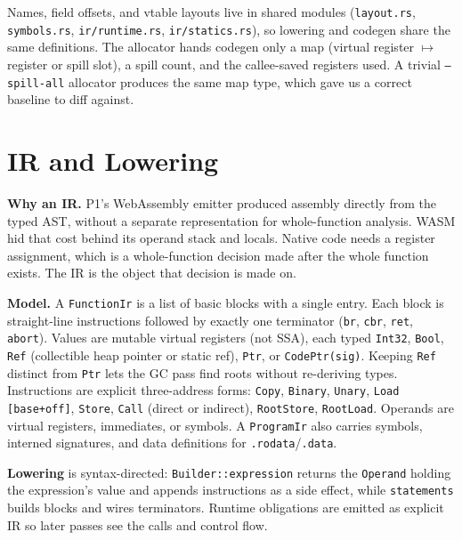 \documentclass[10pt]{article}
\newcommand{\code}[1]{\texttt{\small #1}}
\begin{document}
Names, field offsets, and vtable layouts live in shared modules (\code{layout.rs}, \code{symbols.rs}, \code{ir/runtime.rs}, \code{ir/statics.rs}), so lowering and codegen share the same definitions. The allocator hands codegen only a map (virtual register $\mapsto$ register or spill slot), a spill count, and the callee-saved registers used. A trivial \code{--spill-all} allocator produces the same map type, which gave us a correct baseline to diff against.

\section{IR and Lowering}
\textbf{Why an IR.} P1's WebAssembly emitter produced assembly directly from the typed AST, without a separate representation for whole-function analysis. WASM hid that cost behind its operand stack and locals. Native code needs a register assignment, which is a whole-function decision made after the whole function exists. The IR is the object that decision is made on.

\textbf{Model.} A \code{FunctionIr} is a list of basic blocks with a single entry. Each block is straight-line instructions followed by exactly one terminator (\code{br}, \code{cbr}, \code{ret}, \code{abort}). Values are mutable virtual registers (not SSA), each typed \code{Int32}, \code{Bool}, \code{Ref} (collectible heap pointer or static ref), \code{Ptr}, or \code{CodePtr(sig)}. Keeping \code{Ref} distinct from \code{Ptr} lets the GC pass find roots without re-deriving types. Instructions are explicit three-address forms: \code{Copy}, \code{Binary}, \code{Unary}, \code{Load [base+off]}, \code{Store}, \code{Call} (direct or indirect), \code{RootStore}, \code{RootLoad}. Operands are virtual registers, immediates, or symbols. A \code{ProgramIr} also carries symbols, interned signatures, and data definitions for \code{.rodata}/\code{.data}.

\textbf{Lowering} is syntax-directed: \code{Builder::expression} returns the \code{Operand} holding the expression's value and appends instructions as a side effect, while \code{statements} builds blocks and wires terminators. Runtime obligations are emitted as explicit IR so later passes see the calls and control flow.
\end{document}
